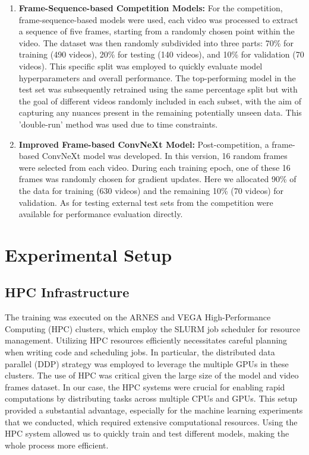 \documentclass[a4paper,12pt,openright]{book}
\begin{document}
\begin{enumerate}
    \item \textbf{Frame-Sequence-based Competition Models:} For the competition, frame-sequence-based models were used, each video was processed to extract a sequence of five frames, starting from a randomly chosen point within the video. The dataset was then randomly subdivided into three parts: 70\% for training (490 videos), 20\% for testing (140 videos), and 10\% for validation (70 videos). This specific split was employed to quickly evaluate model hyperparameters and overall performance. The top-performing model in the test set was subsequently retrained using the same percentage split but with the goal of different videos randomly included in each subset, with the aim of capturing any nuances present in the remaining potentially unseen data. This 'double-run' method was used due to time constraints.


   \item \textbf{Improved Frame-based ConvNeXt Model:} Post-competition, a frame-based ConvNeXt model was developed. In this version, 16 random frames were selected from each video. During each training epoch, one of these 16 frames was randomly chosen for gradient updates. 
   Here we allocated 90\% of the data for training (630 videos) and the remaining 10\% (70 videos) for validation. As for testing external test sets from the competition were available for performance evaluation directly.

\end{enumerate}

\section{Experimental Setup}

\subsection{HPC Infrastructure}
The training was executed on the ARNES and VEGA High-Performance Computing (HPC) clusters, which employ the SLURM job scheduler for resource management. Utilizing HPC resources efficiently necessitates careful planning when writing code and scheduling jobs. In particular, the distributed data parallel (DDP) strategy was employed to leverage the multiple GPUs in these clusters. The use of HPC was critical given the large size of the model and video frames dataset. In our case, the HPC systems were crucial for enabling rapid computations by distributing tasks across multiple CPUs and GPUs. This setup provided a substantial advantage, especially for the machine learning experiments that we conducted, which required extensive computational resources. Using the HPC system allowed us to quickly train and test different models, making the whole process more efficient.
\end{document}
